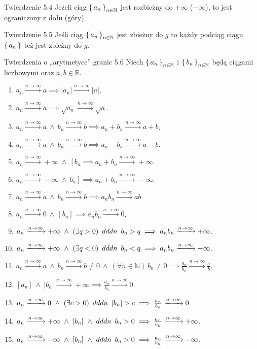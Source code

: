 \documentclass{article}
\newcommand{\hquad}{\mkern9mu}
\newcommand{\R}{\mathbb{R}}
\newcommand{\N}{\mathbb{N}}
\newcommand{\arn}{\xrightarrow{n\to\infty}}
\newcommand{\seq}[1]{\set{#1_n}_{n\in\N}}
\begin{document}
\begin{twier}{Twierdzenie 5.4}
    Jeżeli ciąg $\seq{a}$ jest rozbieżny do $+\infty$ ($-\infty$),
    to jest ograniczony z dołu (góry).
\end{twier}

\begin{twier}{Twierdzenie 5.5}
Jeśli ciąg $\seq{a}$ jest zbieżny do $g$ to każdy podciąg ciągu $\set{a_n}$ też
jest zbieżny do $g$.
\end{twier}

\begin{twier}{Twierdzenia o „arytmetyce” granic 5.6}
    Niech $\seq{a}$ i $\seq{b}$ będą ciągami liczbowymi oraz $a,b \in\R$.
    \begin{enumerate}[label=(\arabic*)]
        \item $a_n\arn a \implies |a_n|\arn|a|$.
        \item $a_n\arn a \implies \sqrt{a_n}\arn\sqrt{a}$.
        \item $a_n\arn a\ \land\  b_n\arn b \implies a_n+b_n\arn a+b$.
        \item $a_n\arn a\ \land\ b_n\arn b\implies a_n-b_n\arn a-b$.
        \item $a_n\arn+\infty\ \land\ \left[b_n\right. \implies a_n+b_n\arn +\infty$.
        \item $a_n\arn-\infty\ \land\ \left.b_n\right] \implies a_n+b_n\arn -\infty$.
        \item $a_n\arn a\ \land\ b_n\arn b\implies a_n b_n \arn ab$.
        \item $a_n\arn 0\ \land\ [b_n]\implies a_nb_n\arn 0$.
        \item $a_n\arn+\infty\ \land\ (\exists q>0)\hquad dddn\hquad b_n>q\implies a_nb_n\arn+\infty$.
        \item $a_n\arn+\infty\ \land\ (\exists q<0)\hquad dddn\hquad b_n<q\implies a_nb_n\arn-\infty$.
        \item $a_n\arn a\ \land\ b_n\arn b\neq0\ \land\ (\forall n\in\N)\ b_n\neq0\implies\frac{a_n}{b_n}\arn\frac{a}{b}$.
        \item $[a_n]\ \land\ |b_n|\arn+\infty\implies \frac{a_n}{b_n}\arn0$.
        \item $a_n\arn0\ \land\ (\exists c>0)\hquad dddn\hquad |b_n|>c \implies \frac{a_n}{b_n}\arn0$.
        \item $a_n\arn+\infty\ \land\ [b_n]\ \land\ dddn\hquad b_n>0\implies \frac{a_n}{b_n}\arn+\infty$.
        \item $a_n\arn-\infty\ \land\ [b_n]\ \land\ dddn\hquad b_n>0\implies \frac{a_n}{b_n}\arn-\infty$.

\end{enumerate}
\end{twier}
\end{document}
